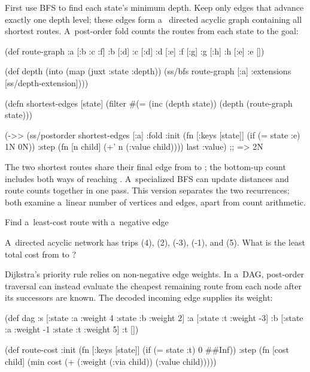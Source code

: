 {{{\smallskip
{} First use BFS to find each state's minimum depth.
Keep only edges that advance exactly one depth level; these edges form a~
directed acyclic graph containing all shortest routes. A~post-order
fold counts the routes from each state to the goal:

\begtt {}
(def route-graph
  {:a [:b :c :f]
   :b [:d]
   :c [:d]
   :d [:e]
   :f [:g]
   :g [:h]
   :h [:e]
   :e []})

(def depth
  (into {} (map (juxt :state :depth))
        (ss/bfs route-graph [:a]
                    {:extensions [ss/depth-extension]})))

(defn shortest-edges [state]
  (filter #(= (inc (depth state)) (depth %
          (route-graph state)))

(->> (ss/postorder shortest-edges [:a]
                  {:fold
                   {:init (fn [{:keys [state]}] (if (= state :e) 1N 0N))
                    :step (fn [n child] (+' n (:value child)))}})
     last
     :value)
;; => 2N
\endtt

The two shortest routes share their final edge from  to
; the bottom-up count includes both ways of reaching .
A~specialized BFS can update distances and route counts together in one
pass. This version separates the two recurrences; both examine a~linear
number of vertices and edges, apart from count arithmetic.

\secc Find a~least-cost route with a~negative edge

 A~directed acyclic network has trips
 (4),  (2),  (-3),
 (-1), and  (5). What is the least total
cost from  to ?

\smallskip
{} Dijkstra's priority rule relies on non-negative
edge weights. In a~DAG, post-order traversal can instead evaluate the
cheapest remaining route from each node after its successors are known. The
decoded incoming edge supplies its weight:

\begtt {}
(def dag
  {:s [{:state :a :weight 4} {:state :b :weight 2}]
   :a [{:state :t :weight -3}]
   :b [{:state :a :weight -1} {:state :t :weight 5}]
   :t []})

(def route-cost
  {:init (fn [{:keys [state]}] (if (= state :t) 0 ##Inf))
   :step (fn [cost child]
           (min cost (+ (:weight (:via child)) (:value child))))})

}}}
